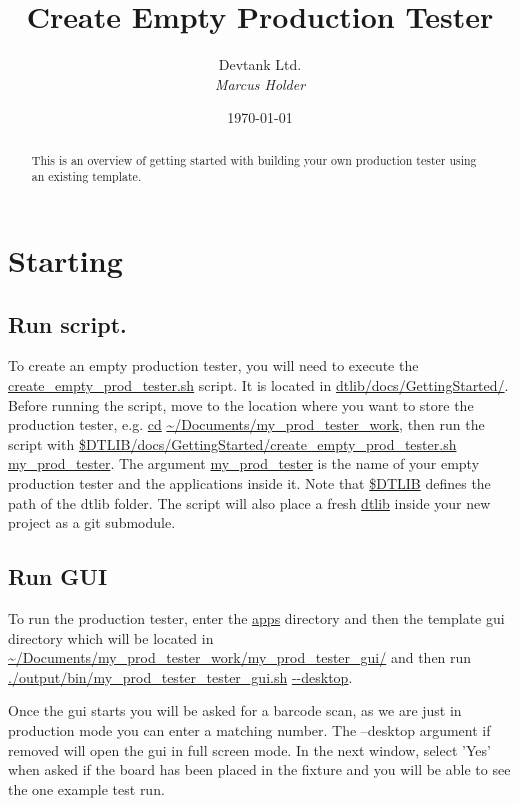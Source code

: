 \documentclass[a4paper,12pt, notitlepage]{article}
\begin{document}
\title{\textbf{\large{Create Empty Production Tester}}}

\author{\normalsize{Devtank Ltd.} \\
        \small\textit{
        Marcus Holder}}
\date{\today}

\maketitle 
\thispagestyle{fancy}


\begin{abstract} 
\noindent
This is an overview of getting started with building your own production tester using an existing template.
\end{abstract}
\vspace{11mm}

\newpage
\tableofcontents
\newpage


\section{Starting}
\label{sec: start}

\subsection{Run script.}
\label{renameStart}

To create an empty production tester, you will need to execute the \url{create_empty_prod_tester.sh} script. It is located in \url{dtlib/docs/GettingStarted/}. Before running the script, move to the location where you want to store the production tester, e.g. \url{cd} \url{~/Documents/my_prod_tester_work}, then run the script with \url{$DTLIB/docs/GettingStarted/create_empty_prod_tester.sh} \url{my_prod_tester}. The argument \url{my_prod_tester} is the name of your empty production tester and the applications inside it. Note that \url{$DTLIB} defines the path of the dtlib folder. The script will also place a fresh \url{dtlib} inside your new project as a git submodule.

\subsection{Run GUI}

To run the production tester, enter the \url{apps} directory and then the template gui directory which will be located in \url{~/Documents/my_prod_tester_work/my_prod_tester_gui/} and then run \url{./output/bin/my_prod_tester_tester_gui.sh} \url{--desktop}.

Once the gui starts you will be asked for a barcode scan, as we are just in production mode you can enter a matching number. The --desktop argument if removed will open the gui in full screen mode. In the next window, select 'Yes' when asked if the board has been placed in the fixture and you will be able to see the one example test run.
\end{document}

